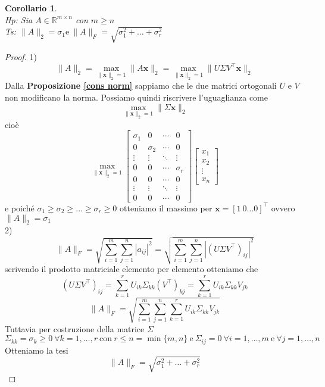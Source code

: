 \documentclass[11pt]{article}
\newtheorem{corollary}{Corollario}
\newcommand{\R}{\mathbb{R}}
\begin{document}
\begin{corollary}\label{norma}
\textbf{}\\
\textit{Hp:} Sia $A\in \R^{m \times n}$ con $m \geq n$ \\
\textit{Ts:} $\|A\|_2=\sigma_1 \text{e} \  \|A\|_F=\sqrt{\sigma_1^2 + \dots + \sigma_r^2}$
\end{corollary}
\begin{proof}
1) \[ \|A\|_2 = \max_{\|\mathbf{x}\|_2 =1} \|A\mathbf{x}\|_2 = \max_{\|\mathbf{x}\|_2 =1} \| U \Sigma V^\top       \mathbf{x} \|_2 \]
Dalla \textbf{Proposizione \ref{cons norm}} sappiamo che le due matrici ortogonali $U$ e $V$ non modificano la norma. Possiamo quindi riscrivere l'uguaglianza come $$\max_{\|\mathbf{x}\|_2 =1} \|\Sigma \mathbf{x}\|_2 $$ cioè $$\max_{\|\mathbf{x}\|_2 =1} \begin{bmatrix}
\sigma_1 & 0 & \cdots & 0 \\
0 & \sigma_2 & \cdots & 0 \\
\vdots & \vdots & \ddots & \vdots \\
0 & 0 & \cdots & \sigma_r \\
0 & 0 & \cdots & 0 \\
\vdots & \vdots & \ddots & \vdots \\
0 & 0 & \cdots & 0
\end{bmatrix} \begin{bmatrix}
x_1 \\
x_2 \\
\vdots \\
x_n
\end{bmatrix}$$ 
e poiché $\sigma_1 \geq \sigma_2 \geq \dots \geq \sigma_r \geq 0$ otteniamo il massimo per $\mathbf{x}=[1 \ 0 \dots 0]^\top      $ ovvero $\|A\|_2= \sigma_1$
\\2)$$\|A\|_F=\sqrt{\sum_{i=1}^m\sum_{j=1}^n|a_{ij}|^2}=\sqrt{\sum_{i=1}^m\sum_{j=1}^n|(U\Sigma V^\top      )_{ij}|^2}$$
scrivendo il prodotto matriciale elemento per elemento otteniamo che $$(U\Sigma V^\top      )_{ij} = \sum_{k=1}^{r} U_{ik} \Sigma_{kk} (V^\top      )_{kj}=\sum_{k=1}^{r} U_{ik} \Sigma_{kk}V_{jk}$$
$$ \|A\|_F=\sqrt{\sum_{i=1}^m\sum_{j=1}^n \sum_{k=1}^{r} U_{ik} \Sigma_{kk}V_{jk}} $$ 
Tuttavia per costruzione della matrice $\Sigma$ $$\Sigma_{kk}=\sigma_k \geq 0 \ \forall k=1,\dots,r \ \text{con} \ r\leq n=\min{\{m,n\}} \ \text{e} \ \Sigma_{ij}=0 \ \forall i=1, \dots, m \ \text{e} \ \forall j=1, \dots, n$$
Otteniamo la tesi $$\|A\|_F=\sqrt{\sigma_1^2 + \dots + \sigma_r^2}$$
\end{proof}
\end{document}
